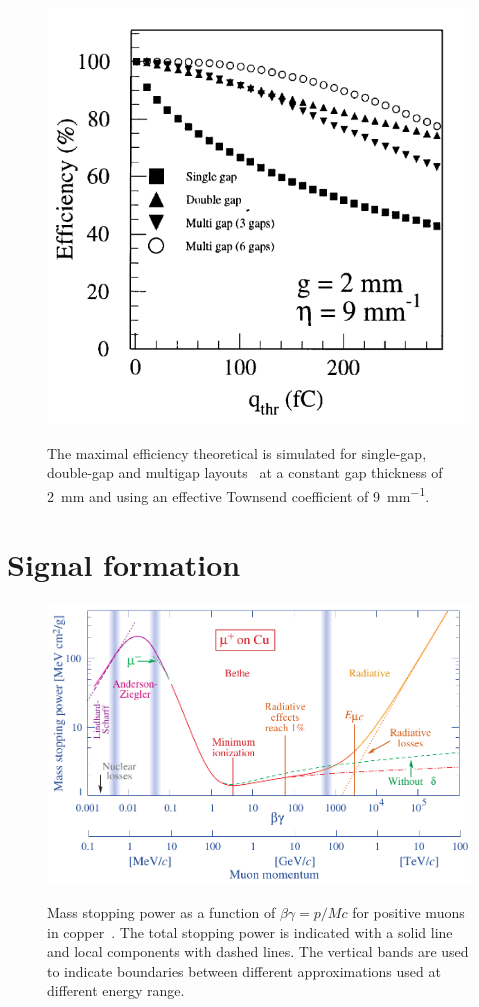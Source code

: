 	\begin{figure}[H]
		\centering
		\includegraphics[width = .45\linewidth]{fig/chapt3/Layout_eff_vs_thr.png}\\
		\caption{\label{fig:EffThreshold} The maximal efficiency theoretical is simulated for single-gap, double-gap and multigap layouts~\cite{ABBRESCIA99} at a constant gap thickness of \SI{2}{mm} and using an effective Townsend coefficient of \SI{9}{mm^{-1}}.}
	\end{figure}

\section{Signal formation}
\label{chapt3:sec:signal}
	
	\begin{figure}[H]
		\centering
		\includegraphics[width = 0.9\linewidth]{fig/chapt3/rpp_icru49_cu_col.pdf}\\
		\caption{\label{fig:enerlylosscopper} Mass stopping power as a function of $\beta\gamma = p/Mc$ for positive muons in copper~\cite{PDG2018}. The total stopping power is indicated with a solid line and local components with dashed lines. The vertical bands are used to indicate boundaries between different approximations used at different energy range.}
	\end{figure}

